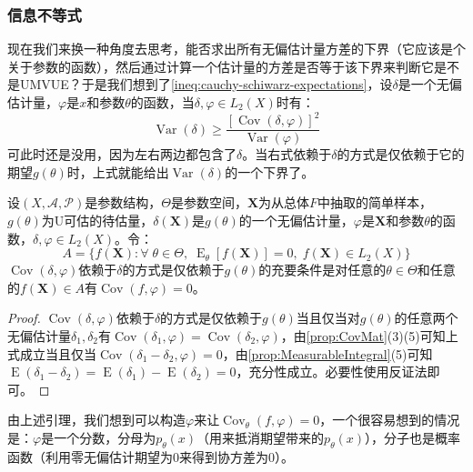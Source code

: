 \subsubsection{信息不等式}
现在我们来换一种角度去思考，能否求出所有无偏估计量方差的下界（它应该是个关于参数的函数），然后通过计算一个估计量的方差是否等于该下界来判断它是不是UMVUE？于是我们想到了\cref{ineq:cauchy-schiwarz-expectations}，设$\delta$是一个无偏估计量，$\varphi$是$x$和参数$\theta$的函数，当$\delta,\varphi\in L_2(X)$时有：
\begin{equation*}
	\operatorname{Var}(\delta)\geqslant\frac{[\operatorname{Cov}(\delta,\varphi)]^2}{\operatorname{Var}(\varphi)}
\end{equation*}
可此时还是没用，因为左右两边都包含了$\delta$。当右式依赖于$\delta$的方式是仅依赖于它的期望$g(\theta)$时，上式就能给出$\operatorname{Var}(\delta)$的一个下界了。
\begin{lemma}
	设$(X,\mathscr{A},\mathscr{P})$是参数结构，$\Theta$是参数空间，$\mathbf{X}$为从总体$F$中抽取的简单样本，$g(\theta)$为U可估的待估量，$\delta(\mathbf{X})$是$g(\theta)$的一个无偏估计量，$\varphi$是$\mathbf{X}$和参数$\theta$的函数，$\delta,\varphi\in L_2(X)$。令：
	\begin{equation*}
		A=\{f(\mathbf{X}):\forall\;\theta\in\Theta,\;\operatorname{E}_{\theta}[f(\mathbf{X})]=0,\;f(\mathbf{X})\in L_2(X)\}
	\end{equation*}
	$\operatorname{Cov}(\delta,\varphi)$依赖于$\delta$的方式是仅依赖于$g(\theta)$的充要条件是对任意的$\theta\in\Theta$和任意的$f(\mathbf{X})\in A$有$\operatorname{Cov}(f,\varphi)=0$。
\end{lemma}
\begin{proof}
	$\operatorname{Cov}(\delta,\varphi)$依赖于$\delta$的方式是仅依赖于$g(\theta)$当且仅当对$g(\theta)$的任意两个无偏估计量$\delta_1,\delta_2$有$\operatorname{Cov}(\delta_1,\varphi)=\operatorname{Cov}(\delta_2,\varphi)$，由\cref{prop:CovMat}(3)(5)可知上式成立当且仅当$\operatorname{Cov}(\delta_1-\delta_2,\varphi)=0$，由\cref{prop:MeasurableIntegral}(5)可知$\operatorname{E}(\delta_1-\delta_2)=\operatorname{E}(\delta_1)-\operatorname{E}(\delta_2)=0$，充分性成立。必要性使用反证法即可。
\end{proof}
\begin{note}
	由上述引理，我们想到可以构造$\varphi$来让$\operatorname{Cov}_{\theta}(f,\varphi)=0$，一个很容易想到的情况是：$\varphi$是一个分数，分母为$p_{\theta}(x)$（用来抵消期望带来的$p_{\theta}(x)$），分子也是概率函数（利用零无偏估计期望为$0$来得到协方差为$0$）。
\end{note}

